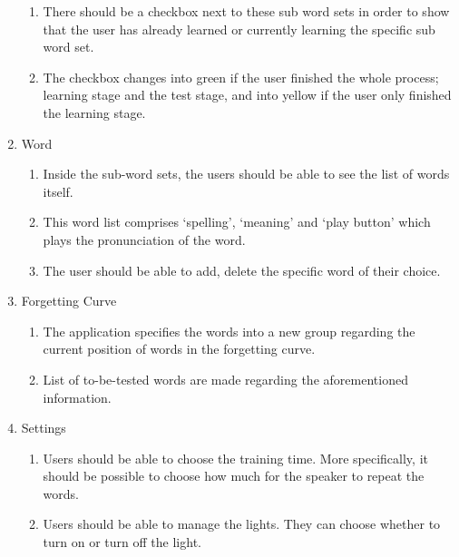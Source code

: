 \documentclass[conference]{IEEEtran}
\begin{document}
\begin{enumerate}
\begin{enumerate}
    \item There should be a checkbox next to these sub word sets in order to show that the user has already learned or currently learning the specific sub word set.
    \item The checkbox changes into green if the user finished the whole process; learning stage and the test stage, and into yellow if the user only finished the learning stage.
    \end{enumerate}
\item Word
    \begin{enumerate}
    \item Inside the sub-word sets, the users should be able to see the list of words itself.
    \item This word list comprises ‘spelling’, ‘meaning’ and ‘play button’ which plays the pronunciation of the word. 
    \item The user should be able to add, delete the specific word of their choice.
    \end{enumerate}
\item Forgetting Curve
    \begin{enumerate}
    \item The application specifies the words into a new group regarding the current position of words in the forgetting curve.
    \item List of to-be-tested words are made regarding the aforementioned information. 
    \end{enumerate}
\item Settings
    \begin{enumerate}
    \item Users should be able to choose the training time. More specifically, it should be possible to choose how much for the speaker to repeat the words.
    \item Users should be able to manage the lights. They can choose whether to turn on or turn off the light. 
    \end{enumerate}
\end{enumerate}
\end{document}

